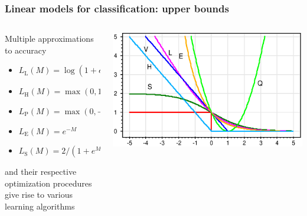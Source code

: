 \documentclass[usenames,dvipsnames,aspectratio=169]{beamer}
\begin{document}
\begin{frame}
\frametitle{Linear models for classification: upper bounds}


\vspace{-2.5mm}
\begin{columns}
\begin{column}{0.4\textwidth}

Multiple approximations to accuracy
\begin{itemize}

\item $L_{\mbox{L}}(M) = \log(1 + e^{-M})$
\item $L_{\mbox{H}}(M) = \max(0, 1 - M)$
\item $L_{\mbox{P}}(M) = \max(0, -M)$
\item $L_{\mbox{E}}(M) = e^{-M}$
\item $L_{\mbox{S}}(M) = 2 / (1 + e^{M})$

\end{itemize}
and their respective optimization procedures
give rise to various learning algorithms

\end{column}
\begin{column}{0.6\textwidth}  %
    \begin{center}
    \includegraphics[width=\columnwidth]{threshold-approx-2.eps}
     \end{center}
\end{column}
\end{columns}

\end{frame}
\end{document}
